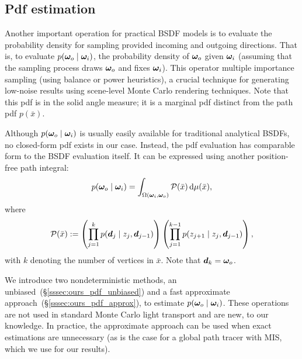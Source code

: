 


\subsection{Pdf estimation}
\label{subsec:ours_pdf}

Another important operation for practical BSDF models is to evaluate the probability density for sampling provided incoming and outgoing directions.
That is, to evaluate $p(\bm{\omega}_o \;|\; \bm{\omega}_i)$, the probability density of $\bm{\omega}_o$ given $\bm{\omega}_i$ (assuming that the sampling process draws $\bm{\omega}_o$ and fixes $\bm{\omega}_i$).
This operator  multiple importance sampling (using balance or power heuristics), a crucial technique for generating low-noise results using scene-level Monte Carlo rendering techniques. Note that this pdf is in the solid angle measure; it is a marginal pdf distinct from the path pdf $p(\bar x)$.

Although $p(\bm{\omega}_o \;|\; \bm{\omega}_i)$ is usually easily available for traditional analytical BSDFs, no closed-form pdf exists in our case. Instead, the pdf evaluation has comparable form to the BSDF evaluation itself. It can be expressed using another position-free path integral:
%
\begin{equation}
\label{eqn:ours_pdf}
p(\bm{\omega}_o \;|\; \bm{\omega}_i) = \int_{\Omega(\bm{\omega}_i, \bm{\omega}_o)} \mathcal{P}(\bar{x}) \,\mathrm{d}\mu(\bar{x}),
\end{equation}
%
where
%
\begin{equation}
\mathcal{P}(\bar{x}) := \left(\prod_{j = 1}^k p(\bm{d}_j \;|\; z_j, \bm{d}_{j - 1})\right) \left(\prod_{j = 1}^{k - 1} p(z_{j + 1} \;|\; z_j, \bm{d}_{j - 1})\right),
\end{equation}
%
with $k$ denoting the number of vertices in $\bar{x}$. Note that $\bm{d}_k = \bm{\omega}_o$.

We introduce two nondeterministic methods, an unbiased~(\S\ref{sssec:ours_pdf_unbiased}) and a fast approximate approach~(\S\ref{sssec:ours_pdf_approx}), to estimate $p(\bm{\omega}_o \;|\; \bm{\omega}_i)$.
These operations are not used in standard Monte Carlo light transport and are new, to our knowledge.
In practice, the approximate approach can be used when exact estimations are unnecessary (as is the case for a global path tracer with MIS, which we use for our results).

